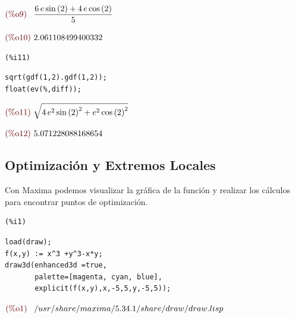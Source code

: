 \documentclass[12pt]{article}
\begin{document}
\begin{math}\displaystyle
\parbox{8ex}{\color{labelcolor}(\%o9) }
\frac{6\,e\,\mathrm{sin}\left( 2\right) +4\,e\,\mathrm{cos}\left( 2\right) }{5}
\end{math}

\begin{math}\displaystyle
\parbox{8ex}{\color{labelcolor}(\%o10) }
2.061108499400332
\end{math}


\noindent
\begin{minipage}[t]{8ex}{\color{red}\bf
\begin{verbatim}
(%i11) 
\end{verbatim}}
\end{minipage}
\begin{minipage}[t]{\textwidth}{\color{blue}
\begin{verbatim}
sqrt(gdf(1,2).gdf(1,2));
float(ev(%,diff));
\end{verbatim}}
\end{minipage}
\begin{math}\displaystyle
\parbox{8ex}{\color{labelcolor}(\%o11) }
\sqrt{4\,{e}^{2}\,{\mathrm{sin}\left( 2\right) }^{2}+{e}^{2}\,{\mathrm{cos}\left( 2\right) }^{2}}
\end{math}

\begin{math}\displaystyle
\parbox{8ex}{\color{labelcolor}(\%o12) }
5.071228088168654
\end{math}

\subsection{Optimización y Extremos Locales}
Con Maxima podemos visualizar la gráfica de la función y realizar los cálculos para encontrar puntos de optimización.

\noindent
\begin{minipage}[t]{8ex}{\color{red}\bf
\begin{verbatim}
(%i1) 
\end{verbatim}}
\end{minipage}
\begin{minipage}[t]{\textwidth}{\color{blue}
\begin{verbatim}
load(draw);
f(x,y) := x^3 +y^3-x*y;
draw3d(enhanced3d =true,
       palette=[magenta, cyan, blue],
       explicit(f(x,y),x,-5,5,y,-5,5));
\end{verbatim}}
\end{minipage}
\begin{math}\displaystyle
\parbox{8ex}{\color{labelcolor}(\%o1) }
/usr/share/maxima/5.34.1/share/draw/draw.lisp
\end{math}
\end{document}
